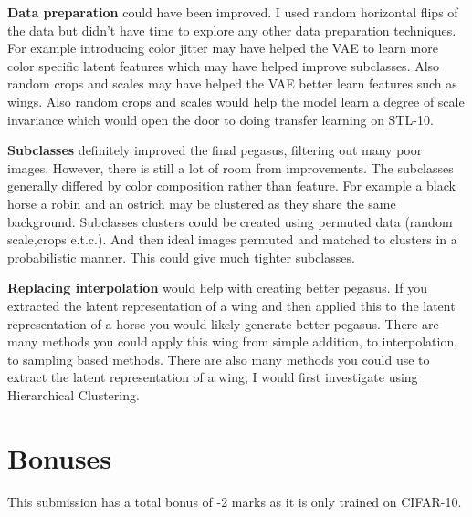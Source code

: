 \documentclass{article}
\begin{document}
\textbf{Data preparation} could have been improved. I used random horizontal flips of the data but didn't have time to explore any other data preparation techniques. For example introducing color jitter may have helped the VAE to learn more color specific latent features which may have helped improve subclasses. Also random crops and scales may have helped the VAE better learn features such as wings. Also random crops and scales would help the model learn a degree of scale invariance which would open the door to doing transfer learning on STL-10.  

\textbf{Subclasses} definitely improved the final pegasus, filtering out many poor images. However, there is still a lot of room from improvements. The subclasses generally differed by color composition rather than feature. For example a black horse a robin and an ostrich may be clustered as they share the same background. Subclasses clusters could be created using permuted data (random scale,crops e.t.c.). And then ideal images permuted and matched to clusters in a probabilistic manner. This could give much tighter subclasses.

\textbf{Replacing interpolation} would help with creating better pegasus. If you extracted the latent representation of a wing and then applied this to the latent representation of a horse you would likely generate better pegasus. There are many methods you could apply this wing from simple addition, to interpolation, to sampling based methods. There are also many methods you could use to extract the latent representation of a wing, I would first investigate using Hierarchical Clustering.


\section*{Bonuses}
This submission has a total bonus of -2 marks as it is only trained on CIFAR-10.

\printbibliography
\end{document}
